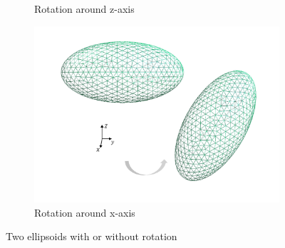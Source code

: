 \begin{figure}[H]
\begin{subfigure}{.5\linewidth}
    \caption{Rotation around z-axis}
    \label{Rotation around z-axis}
    \end{subfigure}%
    \begin{subfigure}{.5\linewidth}
    \centering
    \includegraphics[scale = 0.4]{figures/Ellipsoid_x_axis}
    \caption{Rotation around x-axis}
    \label{Rotation around x-axis}
    \end{subfigure}
    \caption{Two ellipsoids with or without rotation}
    \label{Two ellipsoids}
    \end{figure}

